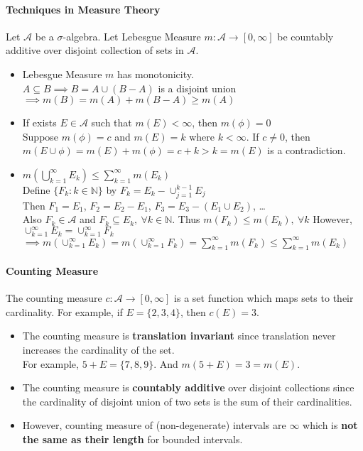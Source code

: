 \paragraph{Techniques in Measure Theory}
	Let $\mathcal{A}$ be a $\sigma$-algebra.
	Let Lebesgue Measure $m : \mathcal{A} \to [0,\infty]$ be countably additive over disjoint collection of sets in $\mathcal{A}$.
\begin{itemize}
	\item Lebesgue Measure $m$ has monotonicity.\\
		$A \subseteq B \implies B = A \cup (B-A)$ is a disjoint union \\
		$\implies m(B) = m(A) + m(B-A) \ge m(A)$
	\item If exists $E \in \mathcal{A}$ such that $m(E) < \infty$, then $m(\phi) = 0$\\
		Suppose $m(\phi) = c$ and $m(E) = k$ where $k < \infty$.
		If $c \ne 0$, then $m(E \cup \phi) = m(E) + m(\phi) = c+k > k = m(E)$ is a contradiction.
	\item $\displaystyle m\left(\bigcup_{k=1}^\infty E_k\right) \le \sum_{k=1}^\infty m(E_k)$\\
		Define $\{ F_k : k \in \mathbb{N} \}$ by $F_k = E_k - \cup_{j = 1}^{k-1} E_j$\\
		Then $F_1 = E_1$, $F_2 = E_2 - E_1$, $F_3 = E_3 - (E_1 \cup E_2)$, \dots\\
		Also $F_k \in \mathcal{A}$ and $F_k \subseteq E_k,\ \forall k \in \mathbb{N}$.
		Thus $m(F_k) \le m(E_k),\ \forall k$
		However, $\cup_{k=1}^\infty E_k = \cup_{k=1}^\infty F_k$\\
		$\displaystyle \implies m\left( \cup_{k=1}^\infty E_k \right) = m \left( \cup_{k=1}^\infty F_k \right) = \sum_{k=1}^\infty m(F_k) \le \sum_{k=1}^\infty m(E_k)$
\end{itemize}

\paragraph{Counting Measure}
	The counting measure $c : \mathcal{A} \to [0,\infty]$ is a set function which maps sets to their cardinality.
	For example, if $E = \{2,3,4\}$, then $c(E) = 3$.
\begin{itemize}
	\item The counting measure is \textbf{translation invariant} since translation never increases the cardinality of the set.\\
	For example, $5+E = \{7,8,9\}$.
	And $m(5+E) = 3 = m(E)$.
	\item The counting measure is \textbf{countably additive} over disjoint collections since the cardinality of disjoint union of two sets is the sum of their cardinalities.
	\item However, counting measure of (non-degenerate) intervals are $\infty$ which is \textbf{not the same as their length} for bounded intervals.
\end{itemize}

